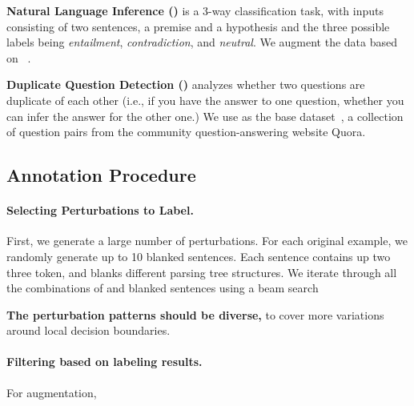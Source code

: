 \textbf{Natural Language Inference (\nli)} is a 3-way classification task, with inputs consisting of two sentences, a premise and a hypothesis and the three possible labels being \emph{entailment}, \emph{contradiction}, and \emph{neutral}.
 We augment the data based on \dnli~\cite{bowman-etal-2015-large}. 
 
\textbf{Duplicate Question Detection (\qqp)} analyzes whether two questions are duplicate of each other (i.e., if you have the answer to one question, whether you can infer the answer for the other one.) 
We use \dqqp as the base dataset~\cite{wang2018glue}, a collection of question pairs from the community question-answering website Quora.



\subsection{Annotation Procedure}



\paragraph{Selecting Perturbations to Label.}
First, we generate a large number of perturbations.
For each original example, we randomly generate up to 10 blanked sentences. Each sentence contains up two three \BLANK token, and blanks different parsing tree structures.
We iterate through all the combinations of \tagstrs and blanked sentences using a beam search


\textbf{The perturbation patterns should be diverse, }to cover more variations around local decision boundaries.


\paragraph{Filtering based on labeling results.}
For augmentation, 



